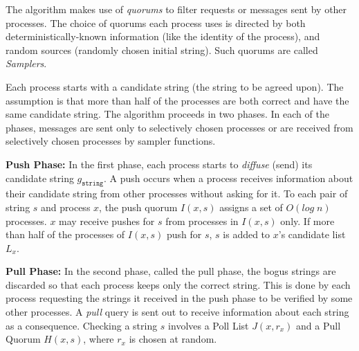 The algorithm makes use of \textit{quorums} to filter requests or messages sent by other processes. The choice of quorums each process uses is directed by both deterministically-known information (like the identity of the process), and random sources (randomly chosen initial string). Such quorums are called \textit{Samplers}.


Each process starts with a candidate string (the string to be agreed upon). The assumption is that more than half of the processes are both correct and have the same candidate string. The algorithm proceeds in two phases. In each of the phases, messages are sent only to selectively chosen processes or are received from selectively chosen processes by sampler functions.

\textbf{Push Phase:} In the first phase, each process starts to \textit{diffuse} (send) its candidate string $g_{\mathtt{string}}$. A push occurs when a process receives information about their candidate string from other processes without asking for it. To each pair of string $s$ and process $x$, the push quorum $I(x,s)$ assigns a set of $O(log\;n)$ processes. $x$ may receive pushes for $s$ from processes in $I(x,s)$ only. If more than half of the processes of $I(x,s)$ push for $s$, $s$ is added to $x$'s candidate list $L_x$. 
 
\textbf{Pull Phase:} In the second phase, called the pull phase, the bogus strings are discarded so that each process keeps only the correct string. This is done by each process requesting the strings it received in the push phase to be verified by some other processes. A \textit{pull} query is sent out to receive information about each string as a consequence. Checking a string $s$ involves a Poll List $J(x, r_x)$ and a Pull Quorum $H(x, s)$, where $r_x$ is chosen at random. 

